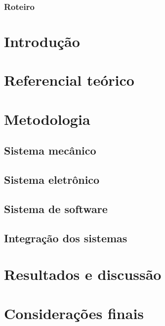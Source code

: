 \documentclass{beamer}
\begin{document}
\begin{frame}
\titlepage
\end{frame}

\begin{frame}
\frametitle{Roteiro}
\tableofcontents[currentsection, hideothersubsections, sectionstyle=show/show]
\end{frame}

\section{Introdução}






\section{Referencial teórico}





\section{Metodologia}

\subsection{Sistema mecânico}




    
\subsection{Sistema eletrônico}











\subsection{Sistema de software}






\subsection{Integração dos sistemas}



\section{Resultados e discussão}
    
\section{Considerações finais}
\end{document}
